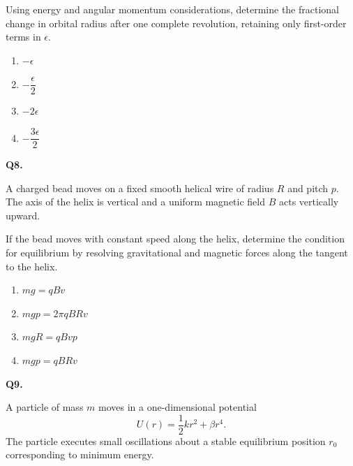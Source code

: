 \documentclass[12pt]{article}
\begin{document}
Using energy and angular momentum considerations, determine the fractional change in orbital radius after one complete revolution, retaining only first-order terms in $\epsilon$.

\begin{enumerate}
\item[(A)] $-\epsilon$
\item[(B)] $-\dfrac{\epsilon}{2}$
\item[(C)] $-2\epsilon$
\item[(D)] $-\dfrac{3\epsilon}{2}$
\end{enumerate}

\bigskip

\textbf{Q8.}

A charged bead moves on a fixed smooth helical wire of radius $R$ and pitch $p$. The axis of the helix is vertical and a uniform magnetic field $B$ acts vertically upward.

If the bead moves with constant speed along the helix, determine the condition for equilibrium by resolving gravitational and magnetic forces along the tangent to the helix.

\begin{center}
\end{center}

\begin{enumerate}
\item[(A)] $mg=qBv$
\item[(B)] $mgp=2\pi qBRv$
\item[(C)] $mgR=qBvp$
\item[(D)] $mgp=qBRv$
\end{enumerate}

\bigskip

\textbf{Q9.}

A particle of mass $m$ moves in a one-dimensional potential  
\[
U(r) = \frac12 kr^2 + \beta r^4.
\]
The particle executes small oscillations about a stable equilibrium position $r_0$ corresponding to minimum energy.
\end{document}

